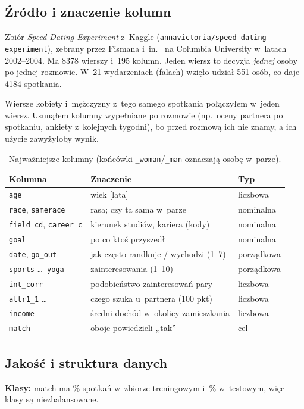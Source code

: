 \documentclass[10pt,twocolumn,a4paper]{article}
\begin{document}
\subsection{Źródło i znaczenie kolumn}
Zbiór \emph{Speed Dating Experiment} z~Kaggle (\texttt{annavictoria/speed-dating-experiment}),
zebrany przez Fismana i~in.~\cite{fisman2006} na Columbia University w~latach 2002--2004.
Ma 8378 wierszy i~195 kolumn. Jeden wiersz to decyzja \emph{jednej} osoby po jednej
rozmowie. W~21 wydarzeniach (falach) wzięło udział 551 osób, co daje 4184 spotkania.

Wiersze kobiety i~mężczyzny z~tego samego spotkania połączyłem w~jeden wiersz.
Usunąłem kolumny wypełniane po rozmowie (np.\ oceny partnera po spotkaniu, ankiety
z~kolejnych tygodni), bo przed rozmową ich nie znamy, a ich użycie zawyżyłoby wynik.

\begin{table}[H]
\centering
\caption{Najważniejsze kolumny (końcówki \texttt{\_woman}/\texttt{\_man} oznaczają osobę w~parze).}
\label{tab:dane}
\footnotesize
\begin{tabularx}{\columnwidth}{@{}lYl@{}}
\toprule
Kolumna & Znaczenie & Typ\\
\midrule
\texttt{age} & wiek [lata] & liczbowa\\
\texttt{race}, \texttt{samerace} & rasa; czy ta sama w~parze & nominalna\\
\texttt{field\_cd}, \texttt{career\_c} & kierunek studiów, kariera (kody) & nominalna\\
\texttt{goal} & po co ktoś przyszedł & nominalna\\
\texttt{date}, \texttt{go\_out} & jak często randkuje / wychodzi (1--7) & porządkowa\\
\texttt{sports} \dots\ \texttt{yoga} & zainteresowania (1--10) & porządkowa\\
\texttt{int\_corr} & podobieństwo zainteresowań pary & liczbowa\\
\texttt{attr1\_1} \dots & czego szuka u~partnera (100 pkt) & liczbowa\\
\texttt{income} & średni dochód w~okolicy zamieszkania & liczbowa\\
\texttt{match} & oboje powiedzieli ,,tak'' & cel\\
\bottomrule
\end{tabularx}
\end{table}

\subsection{Jakość i struktura danych}
\textbf{Klasy:} match ma \MatchTrain\% spotkań w~zbiorze treningowym i~\MatchTest\%
w~testowym, więc klasy są niezbalansowane.
\end{document}
